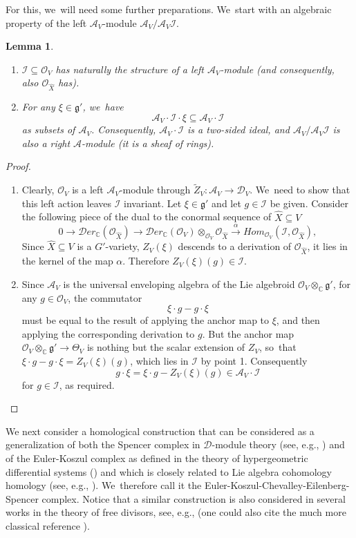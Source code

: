 \documentclass[JEP,XML,SOM,Unicode,published]{cedram}
\let\mathds\mathbb
\newtheorem{lem}[thm]{Lemma}
\newcommand{\dC}{{\mathds C}}\let\C\dC
\newcommand{\cA}{\mathscr{A}}
\newcommand{\cD}{\mathscr{D}}
\newcommand{\cI}{\mathcal{I}}
\newcommand{\cO}{\mathcal{O}}\let\O\cO
\newcommand{\frg}{\mathfrak{g}}
\begin{document}
For this, we~will need some further preparations. We~start with an algebraic property of the left $\cA_V$\nobreakdash-mod\-ule
$\cA_V/\cA_V\cI$.

\skpt
\begin{lem}
\label{lem:IleftAmod}
\begin{enumerate}
\item
$\cI\subseteq\cO_V$ has naturally the structure of a left $\cA_V$\nobreakdash-mod\-ule (and consequently, also $\cO_{\hat{X}}$ has).

\item
For any $\xi\in\frg'$, we~have
\[
\cA_V\cdot \cI \cdot \xi \subseteq\cA_V\cdot \cI
\]
as subsets of $\cA_V$. Consequently, $\cA_V\cdot \cI$ is a two-sided ideal, and $\cA_V/\cA_V\cI$
is also a right $\cA$\nobreakdash-mod\-ule (\ie it is a sheaf of rings).
\end{enumerate}
\end{lem}

\skpt
\begin{proof}
\begin{enumerate}
\item
Clearly, $\cO_V$ is a left $\cA_V$\nobreakdash-mod\-ule
through $\tilde{Z}_V \colon \cA_V\to \cD_V$. We~need to show that this left action leaves $\cI$ invariant. Let $\xi\in \frg'$ and let $g\in \cI$ be given.
Consider the following piece
of the dual to the conormal sequence of $\hat{X}\subseteq V$
\[
0\to
{\cD\!}er_{\dC}(\cO_{\hat{X}})
\to
{\cD\!er}_{\dC}(\cO_V)\otimes_{\cO_V}\cO_{\hat{X}}
\stackrel{\alpha}{\to} {H\!}om_{\cO_V}(\cI,\cO_{\hat{X}}),
\]
Since $\hat{X}\subseteq V$ is a $G'$-variety, $Z_V(\xi)$ descends to a derivation of $\cO_{\hat{X}}$, \ie it lies in the kernel of the map $\alpha$. Therefore $Z_V(\xi)(g)\in \cI$.
\item
Since $\cA_V$ is the universal enveloping algebra of the Lie algebroid $\cO_V\otimes_\dC \frg'$, for any $g\in \cO_V$, the commutator
\[
\xi\cdot g-g\cdot\xi
\]
must be equal to the result of applying the anchor map to $\xi$, and then applying the corresponding derivation to $g$. But the anchor map $\cO_V\otimes_\dC\frg'\to \Theta_V$ is nothing but the scalar extension of $Z_V$, so~that $\xi\cdot g-g\cdot\xi=Z_V(\xi)(g)$, which lies in $\cI$ by point 1. Consequently
\[
g\cdot \xi=\xi\cdot g-Z_V(\xi)(g) \in \cA_V\cdot \cI
\]
for $g\in \mathcal{I}$, as required.\qedhere
\end{enumerate}
\end{proof}

We next consider a homological construction that can be considered as a generalization of both the Spencer complex in $\cD$\nobreakdash-mod\-ule theory (see, e.g., \cite[Lem.\,1.5.27.]{Hotta}) and of the Euler-Koszul complex as defined in the theory of hypergeometric differential systems (\cite[\S 4]{MMW}) and which is closely related to Lie algebra cohomology \resp homology (see, e.g., \cite[\S VII.4]{HiltonStammbach}). We~therefore call it the Euler-Koszul-Chevalley-Eilenberg-Spencer complex. Notice that a similar construction is also considered in several works in the theory of free divisors, see, e.g., \cite[\S 1.1.2.]{CN08} (one could also cite the much more classical reference \cite[\S 4]{Rinehart}).
\end{document}
